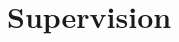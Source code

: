 \documentclass[9pt,a4paper]{article}
\newcommand{\LastName}{Doolittle}
\newcommand{\Initials}{E}
\newcommand{\Me}{\underline{\LastName, \Initials}}  %
\newcommand{\Year}[1]{\fontsize{10pt}{0}\selectfont \texttt{#1}}
\newcommand{\DOI}[1]{doi:\href{https://doi.org/#1}{#1}}
\newcommand{\GitHub}[1]{\faGithub{} \href{https://github.com/#1}{#1}}
\newcommand{\Data}[1]{\faChartBar{} doi:\href{https://doi.org/#1}{#1}}
\begin{document}

\section{Supervision}
\end{document}
